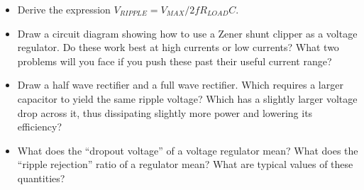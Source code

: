 \begin{itemize}

\item Derive the expression $V_{RIPPLE}=V_{MAX}/2fR_{LOAD} C$.

\item Draw a circuit diagram showing how to use a Zener shunt clipper as a voltage regulator.  Do these work best at high currents or low currents?  What two problems will you face if you push these past their useful current range?

\item Draw a half wave rectifier and a full wave rectifier.  Which requires a larger capacitor to yield the same ripple voltage?  Which has a slightly larger voltage drop across it, thus dissipating slightly more power and lowering its efficiency?

\item What does the ``dropout voltage'' of a voltage regulator mean?  What does the ``ripple rejection'' ratio of a regulator mean?  What are typical values of these quantities? 

\end{itemize}






